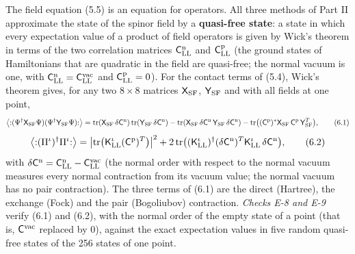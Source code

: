 \documentclass[
  10pt,
]{article}
\begin{document}
The field equation (5.5) is an equation for operators. All three methods
of Part II approximate the state of the spinor field by a
\textbf{quasi-free state}: a state in which every expectation value of a
product of field operators is given by Wick's theorem in terms of the
two correlation matrices \(\mathsf C^{\rm n}_{\rm LL}\) and
\(\mathsf C^{\rm p}_{\rm LL}\) (the ground states of Hamiltonians that
are quadratic in the field are quasi-free; the normal vacuum is one,
with \(\mathsf C^{\rm n}_{\rm LL}=\mathsf C^{\rm vac}_{\rm LL}\) and
\(\mathsf C^{\rm p}_{\rm LL}=0\)). For the contact terms of (5.4),
Wick's theorem gives, for any two \(8\times8\) matrices
\(\mathsf X_{\rm SF}\), \(\mathsf Y_{\rm SF}\) and with all fields at
one point,
\[\big\langle{:}(\Psi^\dagger\mathsf X_{\rm SF}\Psi)(\Psi^\dagger\mathsf Y_{\rm SF}\Psi){:}\big\rangle=\mathrm{tr}(\mathsf X_{\rm SF}\,\delta\mathsf C^{\rm n})\,\mathrm{tr}(\mathsf Y_{\rm SF}\,\delta\mathsf C^{\rm n})-\mathrm{tr}(\mathsf X_{\rm SF}\,\delta\mathsf C^{\rm n}\,\mathsf Y_{\rm SF}\,\delta\mathsf C^{\rm n})-\mathrm{tr}\big((\mathsf C^{\rm p})^*\mathsf X_{\rm SF}\,\mathsf C^{\rm p}\,\mathsf Y_{\rm SF}^T\big),\tag{6.1}\]
\[\big\langle{:}(\Pi^\iota)^\dagger\Pi^\iota{:}\big\rangle=\big\lvert\mathrm{tr}\big(\mathsf K^\iota_{\rm LL}(\mathsf C^{\rm p})^T\big)\big\rvert^2+2\,\mathrm{tr}\big((\mathsf K^\iota_{\rm LL})^\dagger(\delta\mathsf C^{\rm n})^T\mathsf K^\iota_{\rm LL}\,\delta\mathsf C^{\rm n}\big),\tag{6.2}\]
with
\(\delta\mathsf C^{\rm n}=\mathsf C^{\rm n}_{\rm LL}-\mathsf C^{\rm vac}_{\rm LL}\)
(the normal order with respect to the normal vacuum measures every
normal contraction from its vacuum value; the normal vacuum has no pair
contraction). The three terms of (6.1) are the direct (Hartree), the
exchange (Fock) and the pair (Bogoliubov) contraction. \emph{Checks E-8
and E-9} verify (6.1) and (6.2), with the normal order of the empty
state of a point (that is, \(\mathsf C^{\rm vac}\) replaced by 0),
against the exact expectation values in five random quasi-free states of
the 256 states of one point.
\end{document}
